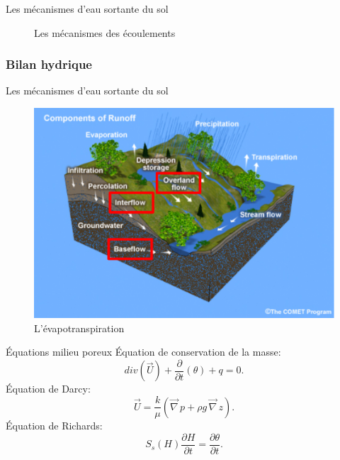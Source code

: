 \documentclass{beamer}
\numberwithin{equation}{section}
\begin{document}
\begin{frame}{Les mécanismes d'eau sortante du sol}
\begin{minipage}[b]{0.5\linewidth}
\begin{figure}
\begin{center}
						\end{center}
					\caption{Les mécanismes des écoulements}
					\end{figure} 
		\end{minipage}
	\end{frame}

	\subsubsection{Bilan hydrique}
	
	\begin{frame}{Les mécanismes d'eau sortante du sol}
		\begin{minipage}[b]{0.5\linewidth}
			\begin{figure}
				\begin{center}
					\includegraphics[scale=0.13]{different_flows.png}
				\end{center}
				\caption{L'évapotranspiration}
			\end{figure} 
		\end{minipage}\hfill
		\begin{minipage}[b]{0.5\linewidth}
			\begin{block}{Équations milieu poreux}
			Équation de conservation de la masse:
			\begin{equation}
				\label{eq-mass-por}
				div(\overrightarrow{U})+\frac{\partial}{\partial t}(\theta)+ q=0.
			\end{equation}
			Équation de Darcy:
			\begin{equation}
				\label{eq-Darcy}
				\overrightarrow{U}=\frac{k}{\mu }(\overrightarrow{\nabla}\, p+\rho g \,\overrightarrow{\nabla}\, z).
			\end{equation} 
			Équation de Richards:
			\begin{equation}
				\label{eq-rapp-dens-H}
				S_s(H)\frac{\partial H}{\partial t}=\frac{\partial\theta}{\partial t}.
			\end{equation}
			\end{block}
		\end{minipage}
	\end{frame}
	
\end{document}
